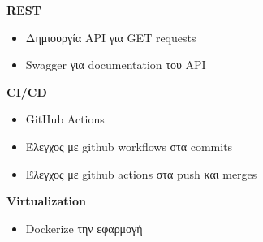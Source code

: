 \documentclass[xcolor=dvipsnames]{beamer}
\begin{document}
    \begin{frame}
        \begin{center}
        \textbf{REST}
        \end{center}
        \begin{itemize}
            \item Δημιουργία API για GET requests
            \item Swagger για documentation του API
        \end{itemize}
    \end{frame}
    \begin{frame}
        \begin{center}
        \textbf{CI/CD}
        \end{center}
        \begin{itemize}
            \item GitHub Actions
            \item Έλεγχος με github workflows στα commits
            \item Έλεγχος με github actions στα push και merges
        \end{itemize}
    \end{frame}
    \begin{frame}
        \begin{center}
        \textbf{Virtualization}
        \end{center}
        \begin{itemize}
            \item Dockerize την εφαρμογή
        \end{itemize}
    \end{frame}
\end{document}
